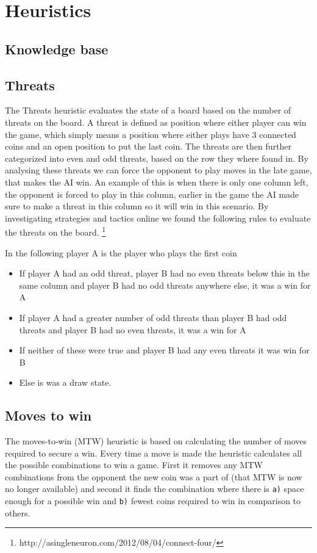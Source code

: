 \documentclass[a4paper, titlepage]{article}
\begin{document}
\section*{Heuristics}
\subsection*{Knowledge base}


\subsection*{Threats}
The Threats heuristic evaluates the state of a board based on the number of
threats on the board. A threat is defined as position where either player can
win the game, which simply means a position where either plays have 3 connected
coins and an open position to put the last coin. The threats are then further
categorized into even and odd threats, based on the row they where found in. By
analysing these threats we can force the opponent to play moves in the late
game, that makes the AI win. An example of this is when there is only one column
left, the opponent is forced to play in this column, earlier in the game the AI
made sure to make a threat in this column so it will win in this scenario. By
investigating strategies and tactics online we found the following rules to
evaluate the threats on the board.
\footnote{http://asingleneuron.com/2012/08/04/connect-four/}

In the following player A is the player who plays the first coin
\begin{itemize} 
	\item If player A had an odd threat, player B had no even threats below this in the same column and player B had no odd threats anywhere else, it was a win for A
	\item If player A had a greater number of odd threats than player B had odd threats and player B had no even threats, it was a win for A	
	\item If neither of these were true and player B had any even threats it was win for B
	\item Else is was a draw state.
\end{itemize} 

\subsection*{Moves to win}
The moves-to-win (MTW) heuristic is based on calculating the number of moves required to 
secure a win. Every time a move is made the heuristic calculates all the possible 
combinations to win a game. First it removes any MTW combinations from the opponent
the new coin was a part of (that MTW is now no longer available) and second it finds 
the combination where there is \texttt{a)} space enough for a possible win and 
\texttt{b)} fewest coins required to win in comparison to others.
\end{document}
